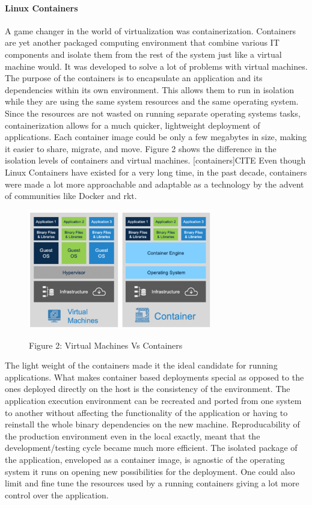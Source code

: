 \documentclass[12pt,titlepage]{article}
\begin{document}
\paragraph{Linux Containers}
\label{sec:org2c9aa33}
A game changer in the world of virtualization was containerization. Containers
are yet another packaged computing environment that combine various IT
components and isolate them from the rest of the system just like a virtual
machine would. It was developed to solve a lot of problems with virtual
machines. The purpose of the containers is to encapsulate an application and its
dependencies within its own environment. This allows them to run in isolation
while they are using the same system resources and the same operating system.
Since the resources are not wasted on running separate operating systems tasks,
containerization allows for a much quicker, lightweight deployment of
applications. Each container image could be only a few megabytes in size, making
it easier to share, migrate, and move. Figure 2 shows the difference in the
isolation levels of containers and virtual machines.
[containers]CITE Even though Linux Containers
have existed for a very long time, in the past decade, containers were made a
lot more approachable and adaptable as a
technology by the advent of communities like Docker and rkt.

\begin{figure}[!h]
    \caption{Figure 2: Virtual Machines Vs Containers}
    \centering
    \includegraphics[width=80mm]{./thesis_images/VM_image.PNG}
    \label{fig:vm_vs_containers}
\end{figure}

The light weight of the containers
made it the ideal candidate for running applications. What makes container based deployments special
as opposed to the ones deployed directly on the host is the consistency of the environment. The application
execution environment can be recreated and ported from one system to another without affecting the functionality
of the application or having to reinstall the whole binary dependencies on the new machine. Reproducability of the
production environment even in the local exactly, meant that the development/testing cycle became much more efficient.
The isolated package of the application, enveloped as a container image, is
agnostic of the operating system it runs on opening new possibilities for the
deployment. One could also limit and fine tune the resources used by a running
containers giving a lot more control over the application.
\end{document}
